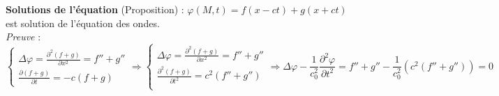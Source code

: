 \noindent\textbf{Solutions de l'équation} (Proposition) : $\varphi(M,t)=f(x-ct)+g(x+ct)$ est solution de l'équation des ondes. \\
\emph{Preuve} : 
\[
\left \{
  \begin{array}{l}
  \Delta\varphi=\frac{\partial^2(f+g)}{\partial x^2}=f''+g'' \\
  \frac{\partial(f+g)}{\partial t}=-c(f+g)
  \end{array}
\right.
\Rightarrow 
\left \{
  \begin{array}{l}
  \Delta\varphi=\frac{\partial^2(f+g)}{\partial x^2}=f''+g'' \\
  \frac{\partial^2(f+g)}{\partial t^2}=c^2(f''+g'') \\
  \end{array}
\right.
\Rightarrow \Delta\varphi-\frac{1}{c_0^2}\frac{\partial^2\varphi}{\partial t^2}=f''+g''-\frac{1}{c_0^2}(c^2(f''+g''))=0
\]

